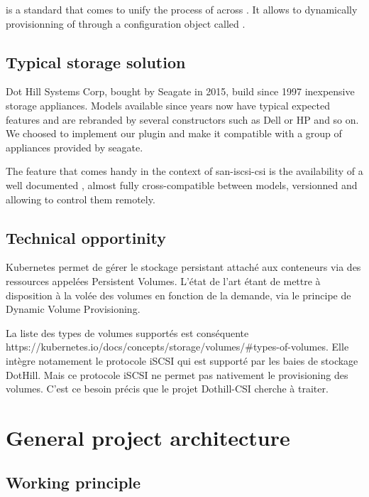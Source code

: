  is a standard that comes to unify the process of  across . It allows to dynamically provisionning of  through a configuration object called .

\subsection{Typical storage solution}

Dot Hill Systems Corp, bought by Seagate in 2015, build since 1997 inexpensive storage appliances. Models available since years now have typical expected features and are rebranded by several constructors such as Dell or HP and so on. We choosed to implement our  plugin and make it compatible with a group of appliances provided by seagate.

The feature that comes handy in the context of \gls{san-iscsi-csi} is the availability of a well documented , almost fully cross-compatible between models, versionned and allowing to control them remotely.

\subsection{Technical opportinity}

\color{darkgreen}
Kubernetes permet de gérer le stockage persistant attaché aux conteneurs via des ressources appelées Persistent Volumes. L'état de l'art étant de mettre à disposition à la volée des volumes en fonction de la demande, via le principe de Dynamic Volume Provisioning.

La liste des types de volumes supportés est conséquente https://kubernetes.io/docs/concepts/storage/volumes/\#types-of-volumes. Elle intègre notamement le protocole iSCSI qui est supporté par les baies de stockage DotHill. Mais ce protocole iSCSI ne permet pas nativement le provisioning des volumes. C'est ce besoin précis que le projet Dothill-CSI cherche à traiter.
\color{black}

\section{General project architecture}

\subsection{Working principle}

